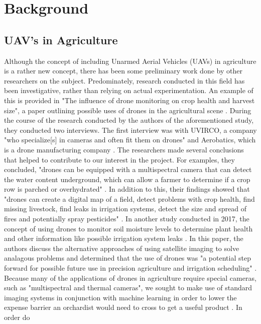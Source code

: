 \section{Background}
\subsection{UAV's in Agriculture}
Although the concept of including Unarmed Aerial Vehicles (UAVs) in agriculture is a rather new concept, there has been some preliminary work done by other researchers on the subject.
Predominately, research conducted in this field has been investigative, rather than relying on actual experimentation.
An example of this is provided in "The influence of drone monitoring on crop health and harvest size", a paper outlining possible uses of drones in the agricultural scene \cite{Reinecke2017}.
During the course of the research conducted by the authors of the aforementioned study, they conducted two interviews. 
The first interview was with UVIRCO, a company "who specialize[s] in cameras and often fit them on drones" and Aerobatics, which is a drone manufacturing company \cite{Reinecke2017}.
The researchers made several conclusions that helped to contribute to our interest in the project.
For examples, they concluded, "drones can be equipped with a multispectral camera that can detect the water content underground, which can allow a farmer to determine if a crop row is parched or overhydrated" \cite{Reinecke2017}.
In addition to this, their findings showed that "drones can create a digital map of a field, detect problems with crop health, find missing livestock, find leaks in irrigation systems, detect the size and spread of fires and potentially spray pesticides" \cite{Reinecke2017}.
In another study conducted in 2017, the concept of using drones to monitor soil moisture levels to determine plant health and other information like possible irrigation system leaks \cite{Hassan2017}. In this paper, the authors discuss the alternative approaches of using satellite imaging to solve analagous problems and determined that the use of drones was "a potential step forward for possible future use in precision agriculture and irrigation scheduling" \cite{Hassan2017}.
\\
Because many of the applications of drones in agriculture require special cameras, such as "multispectral and thermal cameras", we sought to make use of standard imaging systems in conjunction with machine learning in order to lower the expense barrier an orchardist would need to cross to get a useful product \cite{Reinecke2017}.
In order do